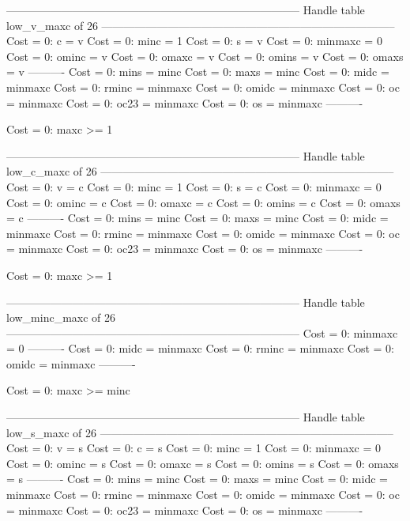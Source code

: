 --------------------------------------------------------------------------------
Handle table low_v_maxc of 26
--------------------------------------------------------------------------------
Cost =  0:  c       = v
Cost =  0:  minc    = 1
Cost =  0:  s       = v
Cost =  0:  minmaxc = 0
Cost =  0:  ominc   = v
Cost =  0:  omaxc   = v
Cost =  0:  omins   = v
Cost =  0:  omaxs   = v
----------
Cost =  0:  mins    = minc
Cost =  0:  maxs    = minc
Cost =  0:  midc    = minmaxc
Cost =  0:  rminc   = minmaxc
Cost =  0:  omidc   = minmaxc
Cost =  0:  oc      = minmaxc
Cost =  0:  oc23    = minmaxc
Cost =  0:  os      = minmaxc
----------

Cost =  0:  maxc >= 1

--------------------------------------------------------------------------------
Handle table low_c_maxc of 26
--------------------------------------------------------------------------------
Cost =  0:  v       = c
Cost =  0:  minc    = 1
Cost =  0:  s       = c
Cost =  0:  minmaxc = 0
Cost =  0:  ominc   = c
Cost =  0:  omaxc   = c
Cost =  0:  omins   = c
Cost =  0:  omaxs   = c
----------
Cost =  0:  mins    = minc
Cost =  0:  maxs    = minc
Cost =  0:  midc    = minmaxc
Cost =  0:  rminc   = minmaxc
Cost =  0:  omidc   = minmaxc
Cost =  0:  oc      = minmaxc
Cost =  0:  oc23    = minmaxc
Cost =  0:  os      = minmaxc
----------

Cost =  0:  maxc >= 1

--------------------------------------------------------------------------------
Handle table low_minc_maxc of 26
--------------------------------------------------------------------------------
Cost =  0:  minmaxc = 0
----------
Cost =  0:  midc    = minmaxc
Cost =  0:  rminc   = minmaxc
Cost =  0:  omidc   = minmaxc
----------

Cost =  0:  maxc >= minc

--------------------------------------------------------------------------------
Handle table low_s_maxc of 26
--------------------------------------------------------------------------------
Cost =  0:  v       = s
Cost =  0:  c       = s
Cost =  0:  minc    = 1
Cost =  0:  minmaxc = 0
Cost =  0:  ominc   = s
Cost =  0:  omaxc   = s
Cost =  0:  omins   = s
Cost =  0:  omaxs   = s
----------
Cost =  0:  mins    = minc
Cost =  0:  maxs    = minc
Cost =  0:  midc    = minmaxc
Cost =  0:  rminc   = minmaxc
Cost =  0:  omidc   = minmaxc
Cost =  0:  oc      = minmaxc
Cost =  0:  oc23    = minmaxc
Cost =  0:  os      = minmaxc
----------

